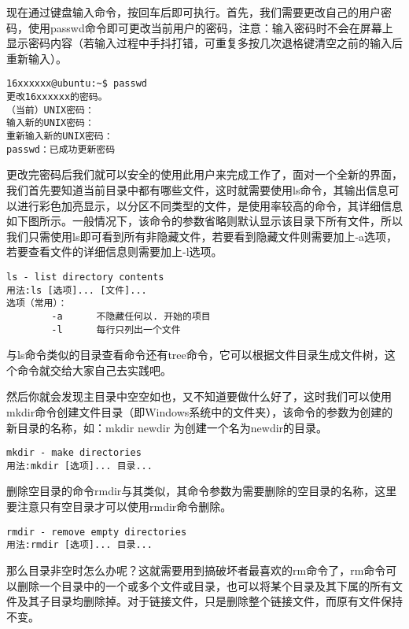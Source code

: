 现在通过键盘输入命令，按回车后即可执行。首先，我们需要更改自己的用户密码，使用passwd命令即可更改当前用户的密码，注意：输入密码时不会在屏幕上显示密码内容（若输入过程中手抖打错，可重复多按几次退格键清空之前的输入后重新输入）。

\begin{verbatim}
16xxxxxx@ubuntu:~$ passwd
更改16xxxxxx的密码。
（当前）UNIX密码：
输入新的UNIX密码：
重新输入新的UNIX密码：
passwd：已成功更新密码
\end{verbatim}

更改完密码后我们就可以安全的使用此用户来完成工作了，面对一个全新的界面，我们首先要知道当前目录中都有哪些文件，这时就需要使用ls命令，其输出信息可以进行彩色加亮显示，以分区不同类型的文件，是使用率较高的命令，其详细信息如下图所示。一般情况下，该命令的参数省略则默认显示该目录下所有文件，所以我们只需使用ls即可看到所有非隐藏文件，若要看到隐藏文件则需要加上-a选项，若要查看文件的详细信息则需要加上-l选项。

\begin{verbatim}
ls - list directory contents
用法:ls [选项]... [文件]...
选项（常用）：
		-a		不隐藏任何以. 开始的项目
		-l		每行只列出一个文件
\end{verbatim}

\begin{note}
与ls命令类似的目录查看命令还有tree命令，它可以根据文件目录生成文件树，这个命令就交给大家自己去实践吧。
\end{note}

然后你就会发现主目录中空空如也，又不知道要做什么好了，这时我们可以使用mkdir命令创建文件目录（即Windows系统中的文件夹），该命令的参数为创建的新目录的名称，如：mkdir newdir 为创建一个名为newdir的目录。

\begin{verbatim}
mkdir - make directories
用法:mkdir [选项]... 目录...
\end{verbatim}

删除空目录的命令rmdir与其类似，其命令参数为需要删除的空目录的名称，这里要注意只有空目录才可以使用rmdir命令删除。

\begin{verbatim}
rmdir - remove empty directories
用法:rmdir [选项]... 目录...
\end{verbatim}

那么目录非空时怎么办呢？这就需要用到搞破坏者最喜欢的rm命令了，rm命令可以删除一个目录中的一个或多个文件或目录，也可以将某个目录及其下属的所有文件及其子目录均删除掉。对于链接文件，只是删除整个链接文件，而原有文件保持不变。

